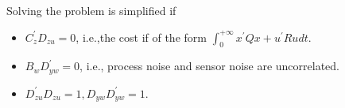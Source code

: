 
Solving the problem is simplified if
\begin{itemize}
    \item $C_{z}^{\prime}D_{zu}=0$, i.e.,the cost if of the form $\int_0^{+\infty}x^{\prime}Qx+u^{\prime}Rudt$.
    \item $B_w D_{yw}^{\prime}=0$, i.e., process noise and sensor noise are uncorrelated.
    \item $D_{zu}^{\prime}D_{zu}=1,D_{yw}D_{yw}^{\prime}=1$.
\end{itemize}


